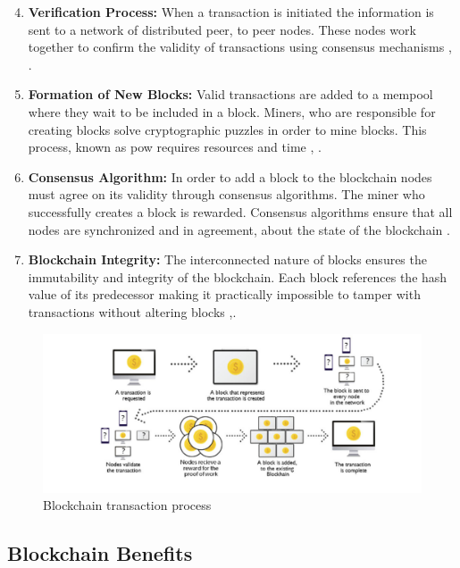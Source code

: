 \begin{enumerate}
    \setcounter{enumi}{3}
    \item \textbf{Verification Process:} When a transaction is initiated the information is sent to a network of distributed peer, to peer nodes. These nodes work together 
    to confirm the validity of transactions using consensus mechanisms \cite{9036241}, \cite{geeksforgeeks}.
    \item \textbf{Formation of New Blocks:} Valid transactions are added to a \gls{mempool} where they wait to be included in a block. Miners, who are responsible 
    for creating blocks solve cryptographic puzzles in order to mine blocks. This process, known as \gls{pow} requires resources and time \cite{9596538}, \cite{geeksforgeeks}.
    \item \textbf{Consensus Algorithm:} In order to add a block to the blockchain nodes must agree on its validity through consensus algorithms. The miner who successfully 
    creates a block is rewarded. Consensus algorithms ensure that all nodes are synchronized and in agreement, about the state of the blockchain \cite{geeksforgeeks}.
    \item \textbf{Blockchain Integrity:} The interconnected nature of blocks ensures the immutability and integrity of the blockchain. Each block references the hash value 
    of its predecessor making it practically impossible to tamper with transactions without altering blocks \cite{9596538} ,\cite{9036241}.
\end{enumerate}

\begin{figure}[h]  
  \centering
  \includegraphics[width=1\textwidth]{Images/c2_2.png} 
  \caption{Blockchain transaction process}
\end{figure}

\subsection{Blockchain Benefits}

